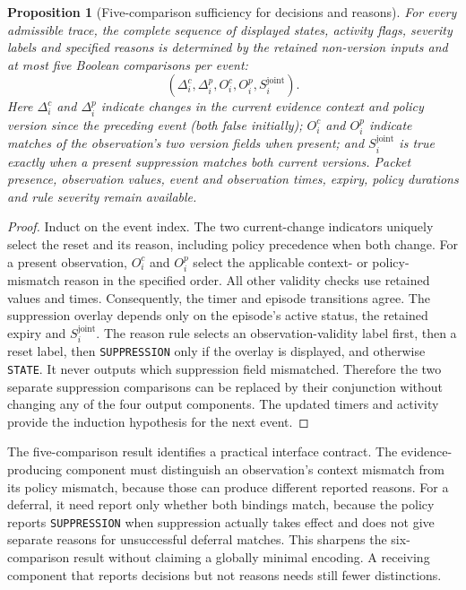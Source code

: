 \documentclass[preprint,11pt]{elsarticle}
\newtheorem{proposition}{Proposition}
\newcommand{\code}[1]{\texttt{#1}}
\begin{document}
\begin{proposition}[Five-comparison sufficiency for decisions and reasons]\label{prop:five-comparison}
For every admissible trace, the complete sequence of displayed states, activity flags, severity labels and specified reasons is determined by the retained non-version inputs and at most five Boolean comparisons per event:
\[
(\Delta^c_i,\Delta^p_i,O^c_i,O^p_i,S^{\mathrm{joint}}_i).
\]
Here $\Delta^c_i$ and $\Delta^p_i$ indicate changes in the current evidence context and policy version since the preceding event (both false initially); $O^c_i$ and $O^p_i$ indicate matches of the observation's two version fields when present; and $S^{\mathrm{joint}}_i$ is true exactly when a present suppression matches both current versions. Packet presence, observation values, event and observation times, expiry, policy durations and rule severity remain available.
\end{proposition}
\begin{proof}
Induct on the event index. The two current-change indicators uniquely select the reset and its reason, including policy precedence when both change. For a present observation, $O^c_i$ and $O^p_i$ select the applicable context- or policy-mismatch reason in the specified order. All other validity checks use retained values and times. Consequently, the timer and episode transitions agree. The suppression overlay depends only on the episode's active status, the retained expiry and $S^{\mathrm{joint}}_i$. The reason rule selects an observation-validity label first, then a reset label, then \code{SUPPRESSION} only if the overlay is displayed, and otherwise \code{STATE}. It never outputs which suppression field mismatched. Therefore the two separate suppression comparisons can be replaced by their conjunction without changing any of the four output components. The updated timers and activity provide the induction hypothesis for the next event.
\end{proof}
The five-comparison result identifies a practical interface contract. The evidence-producing component must distinguish an observation's context mismatch from its policy mismatch, because those can produce different reported reasons. For a deferral, it need report only whether both bindings match, because the policy reports \code{SUPPRESSION} when suppression actually takes effect and does not give separate reasons for unsuccessful deferral matches. This sharpens the six-comparison result without claiming a globally minimal encoding. A receiving component that reports decisions but not reasons needs still fewer distinctions. 
\end{document}
